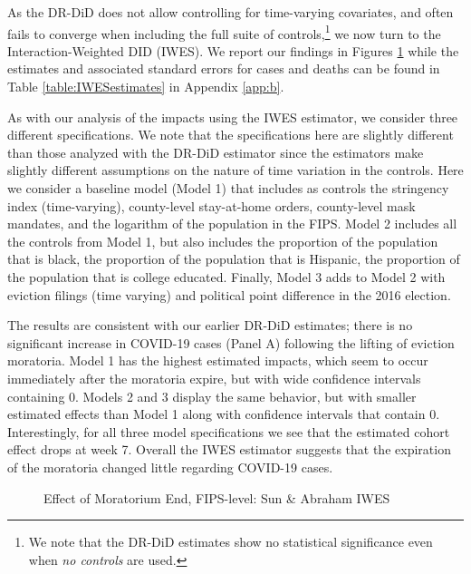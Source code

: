\documentclass[12pt]{amsart}
\begin{document}
As the DR-DiD does not allow controlling for time-varying covariates, and often fails to converge when including the full suite of controls,\footnote{We note that the DR-DiD estimates show no statistical significance even when \textit{no controls} are used.} we now turn to the Interaction-Weighted DID (IWES). We report our findings in Figures \ref{fig:IWESsub} while the estimates and associated standard errors for cases and deaths can be found in Table \ref{table:IWESestimates} in Appendix \ref{app:b}. 

As with our analysis of the impacts using the IWES estimator, we consider three different specifications. We note that the specifications here are slightly different than those analyzed with the DR-DiD estimator since the estimators make slightly different assumptions on the nature of time variation in the controls. Here we consider a baseline model (Model 1) that includes as controls the stringency index (time-varying), county-level stay-at-home orders, county-level mask mandates, and the logarithm of the population in the FIPS. Model 2 includes all the controls from Model 1, but also includes the proportion of the population that is black, the proportion of the population that is Hispanic, the proportion of the population that is college educated. Finally, Model 3 adds to Model 2 with eviction filings (time varying) and political point difference in the 2016 election.

The results are consistent with our earlier DR-DiD estimates; there is no significant increase in COVID-19 cases (Panel A) following the lifting of eviction moratoria. Model 1 has the highest estimated impacts, which seem to occur immediately after the moratoria expire, but with wide confidence intervals containing 0. Models 2 and 3 display the same behavior, but with smaller estimated effects than Model 1 along with confidence intervals that contain 0. Interestingly, for all three model specifications we see that the estimated cohort effect drops at week 7. Overall the IWES estimator suggests that the expiration of the moratoria changed little regarding COVID-19 cases. 

\begin{figure}[H]
    \caption{Effect of Moratorium End, FIPS-level: Sun \& Abraham IWES}
    \centering     %
{\footnotesize \justifying {} \par}
\label{fig:IWESsub}
\end{figure}
\end{document}
